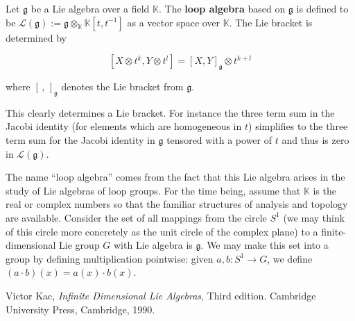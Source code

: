 \documentclass[12pt]{article}
\begin{document}
Let $\mathfrak{g}$ be a Lie algebra over a field $\mathbb{K}$. The \textbf{loop algebra} based on $\mathfrak{g}$ is defined to be $\mathcal{L}(\mathfrak{g}) := \mathfrak{g} \otimes_{\mathbb{K}} \mathbb{K}[t, t^{-1}]$ as a vector space over $\mathbb{K}$. The Lie bracket is determined by

\[ \left[ X \otimes t^k, Y \otimes t^l \right] = \left[ X, Y \right]_{\mathfrak{g}} \otimes t^{k+l} \]

where $\left[\,,\,\right]_{\mathfrak{g}}$ denotes the Lie bracket from $\mathfrak{g}$.

This clearly determines a Lie bracket. For instance the three term sum in the Jacobi identity (for elements which are homogeneous in $t$) simplifies to the three term sum for the Jacobi identity in $\mathfrak{g}$ tensored with a power of $t$ and thus is zero in $\mathcal{L}(\mathfrak{g})$.

The name ``loop algebra'' comes from the fact that this Lie algebra arises in the study of Lie algebras of loop groups.  For the time being, assume that $\mathbb{K}$ is the real or complex numbers so that the familiar structures of analysis and topology are available.  Consider the set of all mappings from the circle $S^1$ (we may think of this circle more concretely as the unit circle of the complex plane) to a finite-dimensional Lie group $G$ with Lie algebra is $\mathfrak{g}$.  We may make this set into a group by defining multiplication pointwise: given $a, b \colon S^1 \to G$, we define $(a \cdot b)(x) = a(x) 
\cdot b(x)$.
\begin{thebibliography}{1}
Victor Kac, \emph{Infinite Dimensional Lie Algebras}, Third edition. Cambridge University Press, Cambridge, 1990.
\end{thebibliography}
\end{document}
